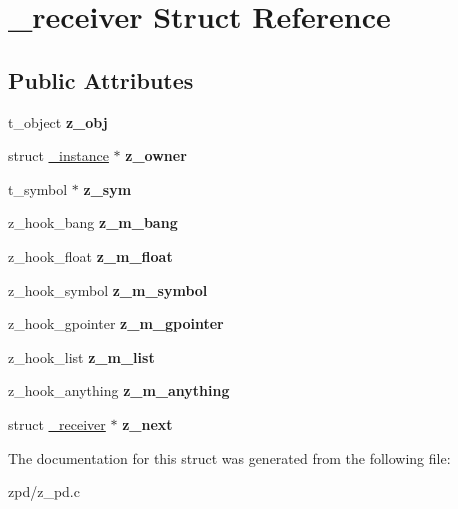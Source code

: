 \hypertarget{struct__receiver}{\section{\-\_\-receiver Struct Reference}
\label{struct__receiver}
}
\subsection*{Public Attributes}
\begin{DoxyCompactItemize}
\item 
\hypertarget{struct__receiver_a156044349b25303abbe471820dc76300}{t\-\_\-object {\bfseries z\-\_\-obj}}\label{struct__receiver_a156044349b25303abbe471820dc76300}

\item 
\hypertarget{struct__receiver_ac89b240e353782ae2e0b7fd30b4e129e}{struct \hyperlink{struct__instance}{\-\_\-instance} $\ast$ {\bfseries z\-\_\-owner}}\label{struct__receiver_ac89b240e353782ae2e0b7fd30b4e129e}

\item 
\hypertarget{struct__receiver_a13386476764d24c6d3dbb5241e628f8f}{t\-\_\-symbol $\ast$ {\bfseries z\-\_\-sym}}\label{struct__receiver_a13386476764d24c6d3dbb5241e628f8f}

\item 
\hypertarget{struct__receiver_afa4f4436fca7194688736805b1c83d23}{z\-\_\-hook\-\_\-bang {\bfseries z\-\_\-m\-\_\-bang}}\label{struct__receiver_afa4f4436fca7194688736805b1c83d23}

\item 
\hypertarget{struct__receiver_a5db134b0fa013d9e89d4e0dffb3a00c0}{z\-\_\-hook\-\_\-float {\bfseries z\-\_\-m\-\_\-float}}\label{struct__receiver_a5db134b0fa013d9e89d4e0dffb3a00c0}

\item 
\hypertarget{struct__receiver_ab5c0bd08e0d786c610bfb45291e7bb00}{z\-\_\-hook\-\_\-symbol {\bfseries z\-\_\-m\-\_\-symbol}}\label{struct__receiver_ab5c0bd08e0d786c610bfb45291e7bb00}

\item 
\hypertarget{struct__receiver_a94be2660b867f5b5a5d9d8c32fc31f59}{z\-\_\-hook\-\_\-gpointer {\bfseries z\-\_\-m\-\_\-gpointer}}\label{struct__receiver_a94be2660b867f5b5a5d9d8c32fc31f59}

\item 
\hypertarget{struct__receiver_a8013084f2e59af774737b791003a9330}{z\-\_\-hook\-\_\-list {\bfseries z\-\_\-m\-\_\-list}}\label{struct__receiver_a8013084f2e59af774737b791003a9330}

\item 
\hypertarget{struct__receiver_ac47ebfc43f444b4efb4c6b300b0207ce}{z\-\_\-hook\-\_\-anything {\bfseries z\-\_\-m\-\_\-anything}}\label{struct__receiver_ac47ebfc43f444b4efb4c6b300b0207ce}

\item 
\hypertarget{struct__receiver_a48815289da13c416662e6c4afbde763f}{struct \hyperlink{struct__receiver}{\-\_\-receiver} $\ast$ {\bfseries z\-\_\-next}}\label{struct__receiver_a48815289da13c416662e6c4afbde763f}

\end{DoxyCompactItemize}


The documentation for this struct was generated from the following file\-:\begin{DoxyCompactItemize}
\item 
zpd/z\-\_\-pd.\-c\end{DoxyCompactItemize}
